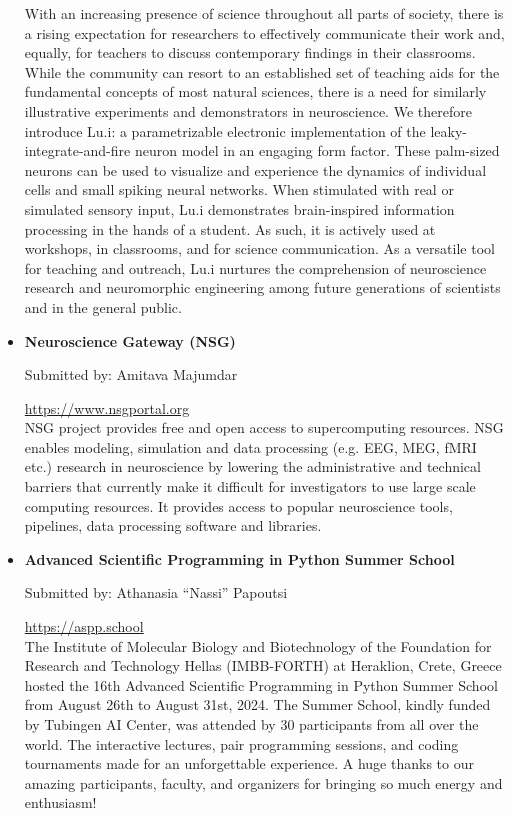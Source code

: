 \begin{itemize}[itemsep=3ex]
        With an increasing presence of science throughout all parts of society, there is a rising expectation for researchers to effectively communicate their work and, equally, for teachers to discuss contemporary findings in their classrooms. While the community can resort to an established set of teaching aids for the fundamental concepts of most natural sciences, there is a need for similarly illustrative experiments and demonstrators in neuroscience. We therefore introduce Lu.i: a parametrizable electronic implementation of the leaky-integrate-and-fire neuron model in an engaging form factor. These palm-sized neurons can be used to visualize and experience the dynamics of individual cells and small spiking neural networks. When stimulated with real or simulated sensory input, Lu.i demonstrates brain-inspired information processing in the hands of a student. As such, it is actively used at workshops, in classrooms, and for science communication. As a versatile tool for teaching and outreach, Lu.i nurtures the comprehension of neuroscience research and neuromorphic engineering among future generations of scientists and in the general public.

    \item \textbf{\large Neuroscience Gateway (NSG)}

        Submitted by: Amitava Majumdar

        \url{https://www.nsgportal.org}\\

        NSG project provides free and open access to supercomputing resources. NSG enables modeling, simulation and data processing (e.g. EEG, MEG, fMRI etc.) research in neuroscience by lowering the administrative and technical barriers that currently make it difficult for investigators to use large scale computing resources. It provides access to popular neuroscience tools, pipelines, data processing software and libraries.


    \item \textbf{\large Advanced Scientific Programming in Python Summer School}

        Submitted by: Athanasia \enquote{Nassi} Papoutsi

        \url{https://aspp.school}\\

        The Institute of Molecular Biology and Biotechnology of the Foundation for Research and Technology Hellas (IMBB-FORTH) at Heraklion, Crete, Greece hosted the 16th Advanced Scientific Programming in Python Summer School from August 26th to August 31st, 2024. The Summer School, kindly funded by Tubingen AI Center, was attended by 30 participants from all over the world. The interactive lectures, pair programming sessions, and coding tournaments made for an unforgettable experience. A huge thanks to our amazing participants, faculty, and organizers for bringing so much energy and enthusiasm!

\end{itemize}

